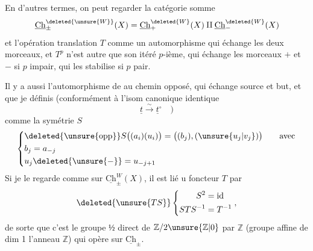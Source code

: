 
En d'autres termes, on peut  regarder
la catégorie somme
\[
\underline{\mathrm{Ch}}_{\pm}^{\deleted{\unsure{W}}}(X)=
\underline{\mathrm{Ch}}_+^{\deleted{W}}(X)\amalg\underline{\mathrm{Ch}}_-^{\deleted{W}}(X)
\]
et l'opération translation $T$ comme un
automorphisme qui échange les deux
morceaux, et $T^p$ n'est autre que son
itéré $p$-ième, qui échange les morceaux $+$ et $-$
si $p$ impair, qui les stabilise si $p$ pair.

Il y a aussi l'automorphisme  de  
au chemin opposé, qui échange source et but,
et que je définis (conformément à l'isom
canonique identique
\[
\underline t\xrightarrow{\sim}\underline t^{\circ}\quad)
\]
comme la symétrie $S$
\[
\left\{\begin{aligned}
&\deleted{\unsure{\mathrm{opp}}}S\bigl((a_i)(u_i)\bigr)=\bigl((b_j),(\unsure{u_j|v_j})\bigr)\qquad\text{avec}\\
&b_j=a_{-j}\\
&u_j\deleted{\unsure{-}}=u_{-j+1}
\end{aligned}\right.
\]
Si je le regarde comme  sur $\underline{\mathrm{Ch}}_{\pm}^{W}(X)$,
il est lié u foncteur $T$ par
\[
\deleted{\unsure{TS}}\left\{\begin{aligned}S^2&=\mathrm{id}\\STS^{-1}&=T^{-1}\end{aligned}\right.,
\]
de sorte que c'est le groupe $\text{½}$ direct de
$\mathbb Z/2\unsure{\mathbb Z|0}$ par $\mathbb Z$ (groupe affine de dim 1 
l'anneau $\mathbb Z$) qui opère sur $\underline{\mathrm{Ch}}_{\pm}$.
